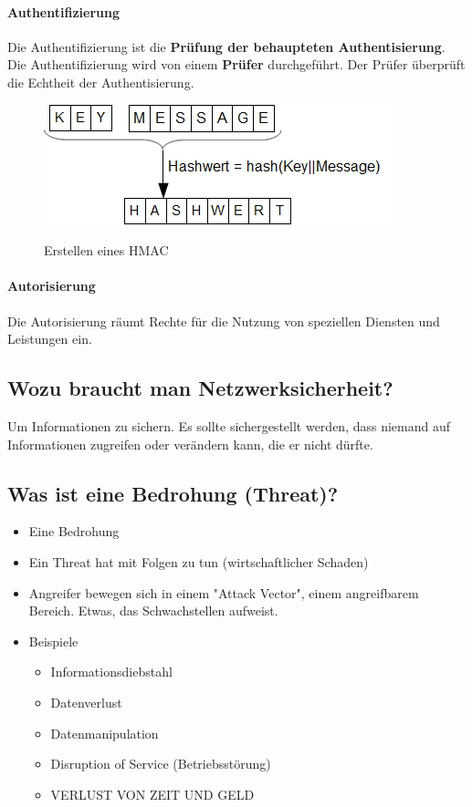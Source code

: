 \paragraph*{Authentifizierung}\label{par:Authentification}\label{para:Authentifizierung}Die Authentifizierung ist die \textbf{Prüfung der behaupteten Authentisierung}. Die Authentifizierung wird von einem \textbf{Prüfer} durchgeführt. Der Prüfer überprüft die Echtheit der Authentisierung.
\begin{figure}[H]
    \begin{center}
    \label{pic:HMAC}
    \includegraphics[width=\textwidth]{images/hmac.png}
    \caption{Erstellen eines HMAC}
    \end{center}
\end{figure}

\paragraph*{Autorisierung}\label{par:Authorization}\label{para:Autorisierung}Die Autorisierung räumt Rechte für die Nutzung von speziellen Diensten und Leistungen ein.

\subsection*{Wozu braucht man Netzwerksicherheit?}
Um Informationen zu sichern. Es sollte sichergestellt werden, dass niemand auf Informationen zugreifen oder verändern kann, die er nicht dürfte.

\subsection*{Was ist eine Bedrohung (Threat)?}
\begin{itemize}
    \item Eine Bedrohung
    \item Ein Threat hat mit Folgen zu tun (wirtschaftlicher Schaden)
    \item Angreifer bewegen sich in einem "Attack Vector", einem angreifbarem Bereich. Etwas, das Schwachstellen aufweist.
    \item Beispiele
    \begin{itemize}
        \item Informationsdiebstahl
        \item Datenverlust
        \item Datenmanipulation
        \item Disruption of Service (Betriebsstörung)
        \item VERLUST VON ZEIT UND GELD
    \end{itemize}
\end{itemize}

